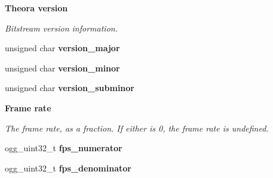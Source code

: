 \begin{Indent}{\bf Theora version}\par
{\em Bitstream version information. }\begin{DoxyCompactItemize}
\item 
\hypertarget{structth__info_a60b3e2cac006fee0e105a918d6a5a9f9}{unsigned char {\bfseries version\+\_\+major}}\label{structth__info_a60b3e2cac006fee0e105a918d6a5a9f9}

\item 
\hypertarget{structth__info_abb1d4887a8079c6c5aaa6d7229f243d7}{unsigned char {\bfseries version\+\_\+minor}}\label{structth__info_abb1d4887a8079c6c5aaa6d7229f243d7}

\item 
\hypertarget{structth__info_abfacc79b7cabae12b6ac2484f76602d3}{unsigned char {\bfseries version\+\_\+subminor}}\label{structth__info_abfacc79b7cabae12b6ac2484f76602d3}

\end{DoxyCompactItemize}
\end{Indent}
\begin{Indent}{\bf Frame rate}\par
{\em The frame rate, as a fraction. If either is 0, the frame rate is undefined. }\begin{DoxyCompactItemize}
\item 
\hypertarget{structth__info_a20606e61676f585a7e59cfc96de190a5}{ogg\+\_\+uint32\+\_\+t {\bfseries fps\+\_\+numerator}}\label{structth__info_a20606e61676f585a7e59cfc96de190a5}

\item 
\hypertarget{structth__info_aa619408f70c03935529f1d3eda7a3ec2}{ogg\+\_\+uint32\+\_\+t {\bfseries fps\+\_\+denominator}}\label{structth__info_aa619408f70c03935529f1d3eda7a3ec2}

\end{DoxyCompactItemize}
\end{Indent}
